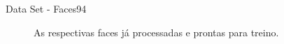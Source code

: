 \documentclass[aspectratio=169, xcolor=dvipsnames]{beamer}
\begin{document}
\begin{frame}{Data Set - Faces94}
\begin{multicols*}{2}
\begin{figure}[h]
					\qquad
					\caption{As respectivas faces já processadas e prontas para treino.}%
					\label{fig:94_cut}%
				\end{figure}
				
			\end{multicols*}
		\end{frame}
	
\end{document}
